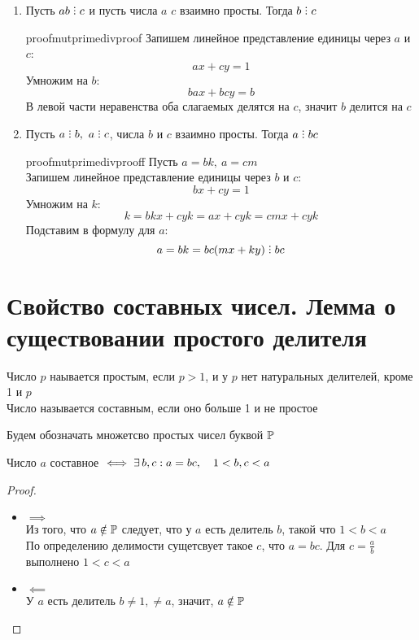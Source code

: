 \begin{property}
	\hfill
	\begin{enumerate}
		\item Пусть $ab \divby c$ и пусть числа $a$  $c$ взаимно просты. Тогда $b \divby c$
		\begin{restatable}{proof}{mutprimedivproof}
			Запишем линейное представление единицы через $a$ и $c$:
			$$ ax + cy = 1 $$
			Умножим на $b$:
			$$ bax + bcy = b $$
			В левой части неравенства оба слагаемых делятся на $c$, значит $b$ делится на $c$
		\end{restatable}
		\item Пусть $a \divby b, ~ a \divby c $, числа $b$ и $c$ взаимно просты. Тогда $a \divby bc $
		\begin{restatable}{proof}{mutprimedivprooff}
			Пусть $a = bk, ~ a = cm$ \\
			Запишем линейное представление единицы через $b$ и $c$:
			$$ bx + cy = 1 $$
			Умножим на $k$:
			$$ k = bkx + cyk = ax + cyk = cmx + cyk $$
			Подставим в формулу для $a$:
			$$ a = bk = bc(mx + ky) \divby bc $$
		\end{restatable}
	\end{enumerate}
\end{property}

\section{Свойство составных чисел. Лемма о существовании простого делителя}

\begin{definition}
	Число $p$ наывается простым, если $p > 1$, и у $p$ нет натуральных делителей, кроме 1 и $p$ \\
	Число называется составным, если оно больше 1 и не простое
\end{definition}

\begin{notation}
	Будем обозначать множетсво простых чисел буквой $\mathbb{P}$
\end{notation}

\begin{property}
	Число $a$ составное $ \iff \exists\, b, c : a = bc, \quad 1 < b, c < a $
\end{property}

\begin{proof}
	\hfill
	\begin{itemize}
		\item $\implies$ \\
		Из того, что $a \notin \mathbb{P}$ следует, что у $a$ есть делитель $b$, такой что $1 < b < a$ \\
		По определению делимости сущетсвует такое $c$, что $a = bc$. Для $c = \frac{a}b$ выполнено $1 < c < a$
		\item $\impliedby$ \\
		У $a$ есть делитель $b \ne 1, \ne a$, значит, $a \notin \mathbb{P}$
	\end{itemize}
\end{proof}

